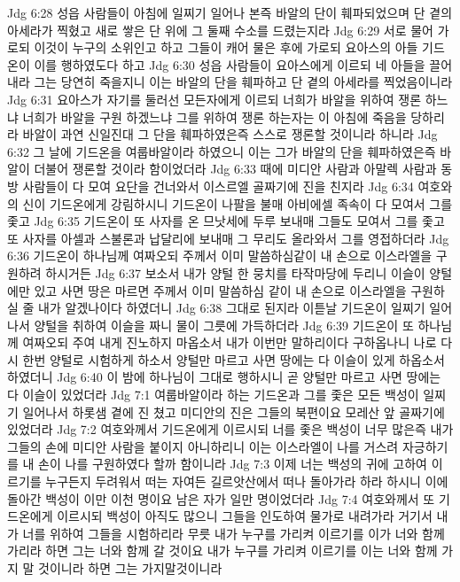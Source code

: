 Jdg 6:28  성읍 사람들이 아침에 일찌기 일어나 본즉 바알의 단이 훼파되었으며 단 곁의 아세라가 찍혔고 새로 쌓은 단 위에 그 둘째 수소를 드렸는지라
Jdg 6:29  서로 물어 가로되 이것이 누구의 소위인고 하고 그들이 캐어 물은 후에 가로되 요아스의 아들 기드온이 이를 행하였도다 하고
Jdg 6:30  성읍 사람들이 요아스에게 이르되 네 아들을 끌어내라 그는 당연히 죽을지니 이는 바알의 단을 훼파하고 단 곁의 아세라를 찍었음이니라
Jdg 6:31  요아스가 자기를 둘러선 모든자에게 이르되 너희가 바알을 위하여 쟁론 하느냐 너희가 바알을 구원 하겠느냐 그를 위하여 쟁론 하는자는 이 아침에 죽음을 당하리라 바알이 과연 신일진대 그 단을 훼파하였은즉 스스로 쟁론할 것이니라 하니라
Jdg 6:32  그 날에 기드온을 여룹바알이라 하였으니 이는 그가 바알의 단을 훼파하였은즉 바알이 더불어 쟁론할 것이라 함이었더라
Jdg 6:33  때에 미디안 사람과 아말렉 사람과 동방 사람들이 다 모여 요단을 건너와서 이스르엘 골짜기에 진을 친지라
Jdg 6:34  여호와의 신이 기드온에게 강림하시니 기드온이 나팔을 불매 아비에셀 족속이 다 모여서 그를 좇고
Jdg 6:35  기드온이 또 사자를 온 므낫세에 두루 보내매 그들도 모여서 그를 좇고 또 사자를 아셀과 스불론과 납달리에 보내매 그 무리도 올라와서 그를 영접하더라
Jdg 6:36  기드온이 하나님께 여짜오되 주께서 이미 말씀하심같이 내 손으로 이스라엘을 구원하려 하시거든
Jdg 6:37  보소서 내가 양털 한 뭉치를 타작마당에 두리니 이슬이 양털에만 있고 사면 땅은 마르면 주께서 이미 말씀하심 같이 내 손으로 이스라엘을 구원하실 줄 내가 알겠나이다 하였더니
Jdg 6:38  그대로 된지라 이튿날 기드온이 일찌기 일어나서 양털을 취하여 이슬을 짜니 물이 그릇에 가득하더라
Jdg 6:39  기드온이 또 하나님께 여짜오되 주여 내게 진노하지 마옵소서 내가 이번만 말하리이다 구하옵나니 나로 다시 한번 양털로 시험하게 하소서 양털만 마르고 사면 땅에는 다 이슬이 있게 하옵소서 하였더니
Jdg 6:40  이 밤에 하나님이 그대로 행하시니 곧 양털만 마르고 사면 땅에는 다 이슬이 있었더라
Jdg 7:1  여룹바알이라 하는 기드온과 그를 좇은 모든 백성이 일찌기 일어나서 하롯샘 곁에 진 쳤고 미디안의 진은 그들의 북편이요 모레산 앞 골짜기에 있었더라
Jdg 7:2  여호와께서 기드온에게 이르시되 너를 좇은 백성이 너무 많은즉 내가 그들의 손에 미디안 사람을 붙이지 아니하리니 이는 이스라엘이 나를 거스려 자긍하기를 내 손이 나를 구원하였다 할까 함이니라
Jdg 7:3  이제 너는 백성의 귀에 고하여 이르기를 누구든지 두려워서 떠는 자여든 길르앗산에서 떠나 돌아가라 하라 하시니 이에 돌아간 백성이 이만 이천 명이요 남은 자가 일만 명이었더라
Jdg 7:4  여호와께서 또 기드온에게 이르시되 백성이 아직도 많으니 그들을 인도하여 물가로 내려가라 거기서 내가 너를 위하여 그들을 시험하리라 무릇 내가 누구를 가리켜 이르기를 이가 너와 함께 가리라 하면 그는 너와 함께 갈 것이요 내가 누구를 가리켜 이르기를 이는 너와 함께 가지 말 것이니라 하면 그는 가지말것이니라
